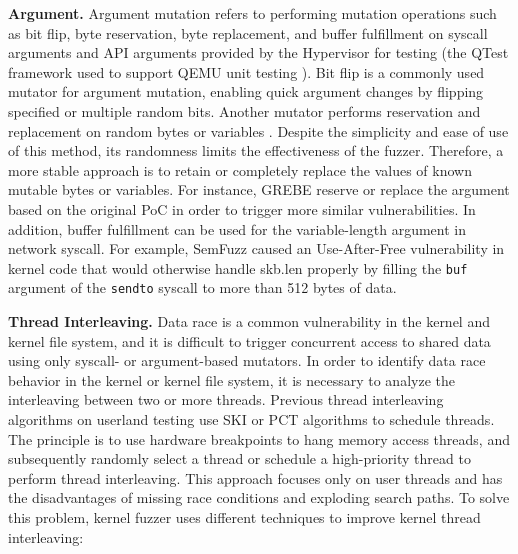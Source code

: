 \textbf{Argument.}
Argument mutation refers to performing mutation operations such as bit flip, byte reservation, byte replacement, and buffer fulfillment on syscall arguments and API arguments provided by the Hypervisor for testing (\eg the QTest framework used to support QEMU unit testing \cite{QTest}). Bit flip is a commonly used mutator for argument mutation, enabling quick argument changes by flipping specified or multiple random bits. Another mutator performs reservation and replacement on random bytes or variables \cite{JANUS2019fuzzing,Hydra2020finding,Liu2023LFuzz}. Despite the simplicity and ease of use of this method, its randomness limits the effectiveness of the fuzzer. Therefore, a more stable approach is to retain or completely replace the values of known mutable bytes or variables. For instance, GREBE \cite{lin2022grebe} reserve or replace the argument based on the original PoC in order to trigger more similar vulnerabilities. In addition, buffer fulfillment can be used for the variable-length argument in network syscall. For example, SemFuzz \cite{you2017semfuzz} caused an Use-After-Free vulnerability in kernel code that would otherwise handle skb.len properly by filling the \texttt{buf} argument of the \texttt{sendto} syscall to more than 512 bytes of data.

\textbf{Thread Interleaving.}
Data race is a common vulnerability in the kernel and kernel file system, and it is difficult to trigger concurrent access to shared data using only syscall- or argument-based mutators.  In order to identify data race behavior in the kernel or kernel file system, it is necessary to analyze the interleaving between two or more threads. Previous thread interleaving algorithms on userland testing use SKI \cite{Fonseca2014SKIEK} or PCT algorithms \cite{Burckhardt2010PCT} to schedule threads. The principle is to use hardware breakpoints to hang memory access threads, and subsequently randomly select a thread or schedule a high-priority thread to perform thread interleaving. This approach focuses only on user threads and has the disadvantages of missing race conditions and exploding search paths. To solve this problem, kernel fuzzer uses different techniques to improve kernel thread interleaving:

